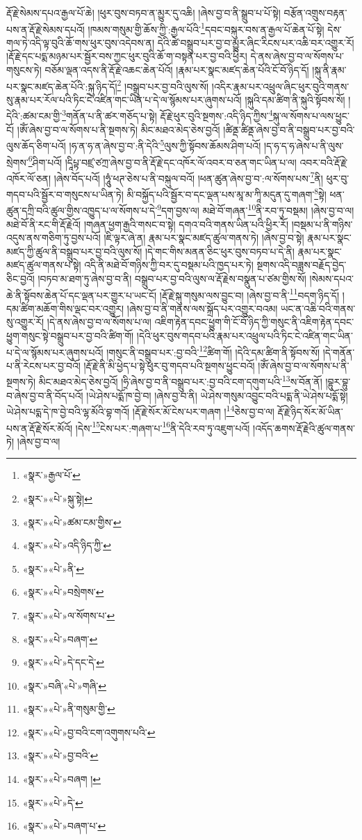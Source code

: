 རྡོ་རྗེ་སེམས་དཔའ་རྒྱལ་པོ་ཆེ། །ཕུར་བུས་བཏབ་ན་མྱུར་དུ་འཆི། །ཞེས་བྱ་བ་ནི་སྒྲུབ་པ་པོ་སྟེ། བརྩོན་འགྲུས་བརྟན་པས་ན་རྡོ་རྗེ་སེམས་དཔའོ། །ཁམས་གསུམ་གྱི་ཆོས་ཀྱི་:རྒྱལ་པོའི་\footnote{«སྣར་»རྒྱལ་པོ་}དབང་བསྐུར་བས་ན་རྒྱལ་པོ་ཆེན་པོ་སྟེ། དེས་གལ་ཏེ་འདི་ལྟ་བུའི་ཆོ་གས་ཕུར་བུས་འདེབས་ན། དེའི་ཚེ་བསྒྲུབ་པར་བྱ་བ་མྱུར་ཞིང་རིངས་པར་འཆི་བར་འགྱུར་རོ། །རྡོ་རྗེ་དང་པདྨ་མཉམ་པར་སྦྱོར་བས་ཀྱང་ཕུར་བུའི་ཆོ་ག་བསྟན་པར་བྱ་བའི་ཕྱིར། དེ་ནས་ཞེས་བྱ་བ་ལ་སོགས་པ་གསུངས་ཏེ། བཅོམ་ལྡན་འདས་ནི་རྡོ་རྗེ་འཆང་ཆེན་པོའོ། །རྣམ་པར་སྣང་མཛད་ཆེན་པོའི་ངོ་བོ་ཉིད་དོ། །སྐུ་ནི་རྣམ་པར་སྣང་མཛད་ཆེན་པོའི་:སྐུ་ཉིད་དོ།\footnote{«སྣར་»«པེ་»སྐུ་སྟེ།} །བསྒྲུབ་པར་བྱ་བའི་ལུས་སོ། །འདིར་རྣམ་པར་འཕྲུལ་ཞིང་ཕུར་བུའི་གནས་སུ་རྣམ་པར་རོལ་པའི་ཏིང་ངེ་འཛིན་གང་ཡིན་པ་དེ་ལ་སྙོམས་པར་ཞུགས་པའོ། །སྐུའི་དམ་ཚིག་ནི་སྐུའི་སྟོབས་སོ། །དེའི་:ཚམ་ངམ་གྱི་\footnote{«སྣར་»«པེ་»ཚམ་ངམ་གྱིས་}གནོན་པ་ནི་ཚར་གཅོད་པ་སྟེ། རྡོ་རྗེ་ཕུར་བུའི་སྔགས་:འདི་ཉིད་ཀྱིས་\footnote{«སྣར་»«པེ་»འདི་ཉིད་ཀྱི་}སྐུ་ལ་སོགས་པ་ལས་ཕྱུང་ངོ། །ཨོཾ་ཞེས་བྱ་བ་ལ་སོགས་པ་ནི་སྔགས་ཏེ། མིང་མཐའ་མེད་ཅེས་བྱའོ། །ཚིནྡ་ཚིནྡ་ཞེས་བྱ་བ་ནི་བསྒྲུབ་པར་བྱ་བའི་ལུས་ཆོད་ཅིག་པའོ། །ཧ་ན་ཧ་ན་ཞེས་བྱ་བ་:ནི་དེའི་\footnote{«སྣར་»«པེ་»ནི་}ལུས་ཀྱི་སྟོབས་ཆོམས་ཤིག་པའོ། །ད་ཧ་ད་ཧ་ཞེས་པ་ནི་ལུས་སྲེགས་\footnote{«སྣར་»«པེ་»བསྲེགས་}ཤིག་པའོ། །དཱིཔྟ་བཛྲ་ཙཀྲ་ཞེས་བྱ་བ་ནི་རྡོ་རྗེ་དང་འཁོར་ལོ་འབར་བ་ཅན་གང་ཡིན་པ་ལ། འབར་བའི་རྡོ་རྗེ་འཁོར་ལོ་ཅན། །ཞེས་བོད་པའོ། །ཧཱུཾ་ཕཊ་ཅེས་པ་ནི་བསྐུལ་བའོ། །ཕན་ཚུན་ཞེས་བྱ་བ་:ལ་སོགས་པས་\footnote{«སྣར་»«པེ་»ལ་སོགས་པ་}ནི། ཕུར་བུ་གདབ་པའི་སྦྱོར་བ་གསུངས་པ་ཡིན་ཏེ། མི་བསྐྱོད་པའི་སྦྱོར་བ་དང་ལྡན་པས་མཱ་མ་ཀཱི་མདུན་དུ་གཞག་\footnote{«སྣར་»«པེ་»བཞག་}སྟེ། ཕན་ཚུན་དཀྲི་བའི་ཚུལ་གྱིས་འཁྱུད་པ་ལ་སོགས་པ་དེ་\footnote{«སྣར་»«པེ་»དེ་དང་དེ་}དག་བྱས་ལ། མཐེ་བོ་གཞན་\footnote{«སྣར་»བཞི་«པེ་»གཞི་}ནི་རབ་ཏུ་བསྡམ། །ཞེས་བྱ་བ་ལ། མཐེ་བོ་ནི་རང་གི་རྡོ་རྗེའོ། །གཞན་ཕྱག་རྒྱའི་གསང་བ་སྟེ། དགའ་བའི་གནས་ཡིན་པའི་ཕྱིར་རོ། །བསྡམ་པ་ནི་གཉིས་འདུས་ནས་གཅིག་ཏུ་བྱས་པའོ། །ཇི་ལྟར་ཞེ་ན། རྣམ་པར་སྣང་མཛད་ཚུལ་གནས་ཏེ། །ཞེས་བྱ་བ་སྟེ། རྣམ་པར་སྣང་མཛད་ཀྱི་ཚུལ་ནི་བསྒྲུབ་པར་བྱ་བའི་ལུས་སོ། །དེ་གང་གིས་མནན་ཅིང་ཕུར་བུས་བཏབ་པ་དེ་ནི། རྣམ་པར་སྣང་མཛད་ཚུལ་གནས་པ་སྟེ། འདི་ནི་མཐེ་བོ་གཉིས་ཀྱི་བར་དུ་བསྡམ་པའི་ཁྱད་པར་ཏེ། སྔགས་འདི་བཟླས་བརྗོད་བྱེད་ཅིང་བྱའོ། །བཏབ་མ་ཐག་ཏུ་ཞེས་བྱ་བ་ནི། བསྒྲུབ་པར་བྱ་བའི་ལུས་ལ་རྡོ་རྗེས་བསྣུན་པ་ཙམ་གྱིས་སོ། །སེམས་དཔའ་ཆེ་ནི་སྟོབས་ཆེན་པོ་དང་ལྡན་པར་གྱུར་པ་ཡང་ངོ། །རྡོ་རྗེ་སྐུ་གསུམ་ལས་བྱུང་བ། །ཞེས་བྱ་བ་ནི་\footnote{«སྣར་»«པེ་»ནི་གསུམ་གྱི་}བདག་ཉིད་དོ། །དམ་ཚིག་མཆོག་གིས་ལྡང་བར་འགྱུར། །ཞེས་བྱ་བ་ནི་གནས་ལས་སྐྲོད་པར་འགྱུར་བའམ། ཡང་ན་འཆི་བའི་གནས་སུ་འགྱུར་རོ། །དེ་ནས་ཞེས་བྱ་བ་ལ་སོགས་པ་ལ། འཇིག་རྟེན་དབང་ཕྱུག་གི་ངོ་བོ་ཉིད་ཀྱི་གསུང་ནི་འཇིག་རྟེན་དབང་ཕྱུག་གསུང་སྟེ་བསྒྲུབ་པར་བྱ་བའི་ཚིག་གོ། །དེའི་ཕུར་བུས་གདབ་པའི་རྣམ་པར་འཕྲུལ་པའི་ཏིང་ངེ་འཛིན་གང་ཡིན་པ་དེ་ལ་སྙོམས་པར་ཞུགས་པའོ། །གསུང་ནི་བསྒྲུབ་པར་:བྱ་བའི་\footnote{«སྣར་»«པེ་»བྱ་བའི་ངག་འགུགས་པའི་}ཚིག་གོ། །དེའི་དམ་ཚིག་ནི་སྟོབས་སོ། །དེ་གནོན་པ་ནི་རེངས་པར་བྱ་བའོ། །རྡོ་རྗེ་ནི་མི་ཕྱེད་པ་སྟེ་ཕུར་བུ་གདབ་པའི་སྔགས་ཕྱུང་བའོ། །ཨོཾ་ཞེས་བྱ་བ་ལ་སོགས་པ་ནི་སྔགས་ཏེ། མིང་མཐའ་མེད་ཅེས་བྱའོ། །ཧྲི་ཞེས་བྱ་བ་ནི་བསྒྲུབ་པར་:བྱ་བའི་ངག་དགུག་པའི་\footnote{«སྣར་»«པེ་»བྱ་བའི་}ས་བོན་ནོ། །བྷུར་བྷུ་བ་ཞེས་བྱ་བ་ནི་བོད་པའོ། །ཡེ་ཤེས་པདྨོ་ཁ་བྱེ་བ། །ཞེས་བྱ་བ་ནི། ཡེ་ཤེས་གསུམ་འབྱུང་བའི་པདྨ་ནི་ཡེ་ཤེས་པདྨོ་སྟེ། ཡེ་ཤེས་པདྨ་དེ་ཁ་བྱེ་བའི་ལྷ་མོའི་བྷ་གའོ། །རྡོ་རྗེ་སོར་མོ་ངེས་པར་གཞག །\footnote{«སྣར་»«པེ་»བཞག །}ཅེས་བྱ་བ་ལ། རྡོ་རྗེ་ཉིད་སོར་མོ་ཡིན་པས་ན་རྡོ་རྗེ་སོར་མོའོ། །དེས་\footnote{«སྣར་»«པེ་»དེ་}ངེས་པར་:གཞག་པ་\footnote{«སྣར་»«པེ་»བཞག་པ་}ནི་དེའི་རབ་ཏུ་འཇུག་པའོ། །འདོད་ཆགས་རྡོ་རྗེའི་ཚུལ་གནས་ཏེ། །ཞེས་བྱ་བ་ལ། 